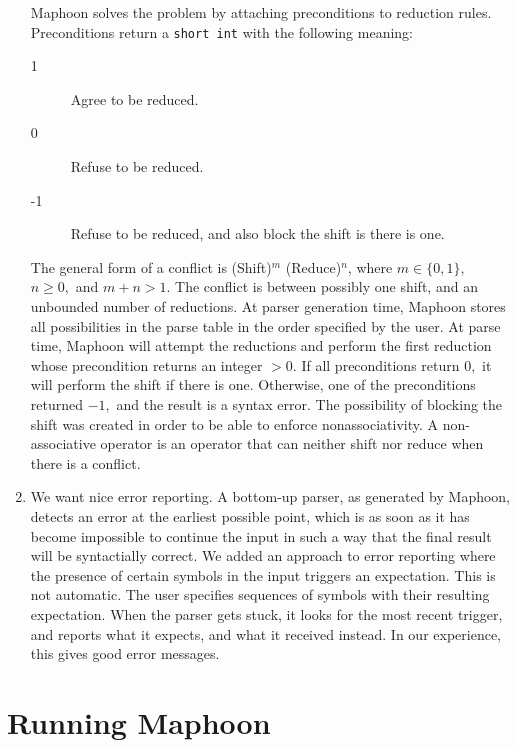 \documentclass{article}
\begin{document}
\begin{enumerate}
   \noindent
   Maphoon solves the problem by attaching preconditions to 
   reduction rules. Preconditions return a \verb+short int+
   with the following meaning:
   \begin{description}   
   \item[1] Agree to be reduced. 
   \item[0] Refuse to be reduced. 
   \item[-1] Refuse to be reduced, and also block the shift
      is there is one.
   \end{description}
   The general form of a conflict
   is (Shift)$^m$ (Reduce)$^n$, where $ m \in \{ 0, 1 \}, $ 
   $ n \geq 0, $ and $ m+n > 1. $
   The conflict is between possibly one shift,
   and an unbounded number of reductions. At parser generation time,
   Maphoon stores all possibilities in the parse table
   in the order specified by the user. 
   At parse time, Maphoon will attempt the reductions
   and perform the first reduction whose precondition returns
   an integer $ > 0. $ 
   If all preconditions return $ 0, $ it will perform the shift
   if there is one. Otherwise, one of the preconditions returned $ -1, $
   and the result is a syntax error. 
   The possibility of blocking the shift was created 
   in order to be able to enforce nonassociativity. 
   A non-associative operator is an
   operator that can neither shift nor reduce when
   there is a conflict.
\item
   We want nice error reporting. A bottom-up parser, as generated
   by Maphoon, detects an error at the earliest possible point,
   which is as soon as it has become impossible to continue the
   input in such a way that the final result will be syntactially correct.
   We added an approach to error reporting where the presence of certain
   symbols in the input triggers an expectation. This is not automatic.
   The user specifies sequences of symbols with their resulting expectation.
   When the parser gets stuck, it looks for the most recent trigger,
   and reports what it expects, and what it received instead. In our
   experience, this gives good error messages. 
   
\end{enumerate} 

\section{Running Maphoon}
\end{document}
